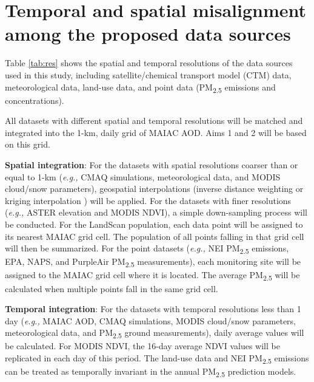 \documentclass[11pt]{article}
\newcommand{\tsub}{\textsubscript}
\begin{document}
\section{Temporal and spatial misalignment among the proposed data sources}
\begin{enumerate*}[{[a)]}]
    \item Table \ref{tab:res} shows the spatial and temporal resolutions of the data sources used in this study, including satellite/chemical transport model (CTM) data, meteorological data, land-use data, and point data (PM\tsub{2.5} emissions and concentrations). 
    \item All datasets with different spatial and temporal resolutions will be matched and integrated into the 1-km, daily grid of MAIAC AOD. Aims 1 and 2 will be based on this grid. {
        \begin{itemize*}
            \item \textbf{Spatial integration}: For the datasets with spatial resolutions coarser than or equal to 1-km (\textit{e.g.,} CMAQ simulations, meteorological data, and MODIS cloud/snow parameters), geospatial interpolations (inverse distance weighting \citep{bartier1996multivariate} or kriging interpolation \citep{oliver1990kriging}) will be applied. For the datasets with finer resolutions (\textit{e.g.,} ASTER elevation and MODIS NDVI), a simple down-sampling process will be conducted. For the LandScan population, each data point will be assigned to its nearest MAIAC grid cell. The population of all points falling in that grid cell will then be summarized. For the point datasets (\textit{e.g.,} NEI PM\tsub{2.5} emissions, EPA, NAPS, and PurpleAir PM\tsub{2.5} measurements), each monitoring site will be assigned to the MAIAC grid cell where it is located. The average PM\tsub{2.5} will be calculated when multiple points fall in the same grid cell. 
            \item \textbf{Temporal integration}: For the datasets with temporal resolutions less than 1 day (\textit{e.g.,} MAIAC AOD, CMAQ simulations, MODIS cloud/snow parameters, meteorological data, and PM\tsub{2.5} ground measurements), daily average values will be calculated. For MODIS NDVI, the 16-day average NDVI values will be replicated in each day of this period. The land-use data and NEI PM\tsub{2.5} emissions can be treated as temporally invariant in the annual PM\tsub{2.5} prediction models. 
        \end{itemize*}
}
\end{enumerate*}
\end{document}
